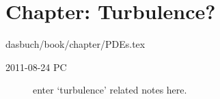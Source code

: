 
\section{Chapter: Turbulence?}
\label{c-PDEs}\noindent dasbuch/book/chapter/PDEs.tex
\renewcommand{\ssp}{a}

\begin{description}

\item[2011-08-24 PC] enter `turbulence' related notes here.

\end{description}
\renewcommand{\ssp}{x}

% 
% 



%


